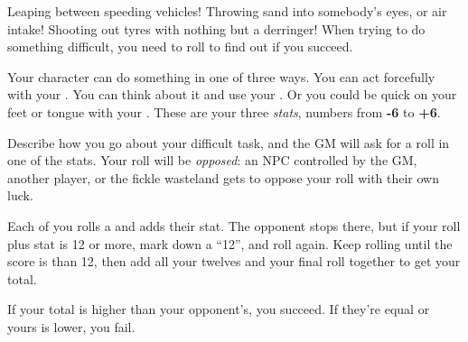 
Leaping between speeding vehicles! Throwing sand into somebody's eyes, or air intake! Shooting out tyres with nothing but a derringer! When trying to do something difficult, you need to roll to find out if you succeed.

Your character can do something in one of three ways. You can act forcefully with your . You can think about it and use your . Or you could be quick on your feet or tongue with your . These are your three \emph{stats}, numbers from \textbf{-6} to \textbf{+6}.

Describe how you go about your difficult task, and the GM will ask for a roll in one of the stats. Your roll will be \emph{opposed}: an NPC controlled by the GM, another player, or the fickle wasteland gets to oppose your roll with their own luck.

Each of you rolls a  and adds their stat. The opponent stops there, but if your roll plus stat is 12 or more, mark down a ``12'', and roll again. Keep rolling until the score is than 12, then add all your twelves and your final roll together to get your total.

If your total is higher than your opponent's, you succeed. If they're equal or yours is lower, you fail.
